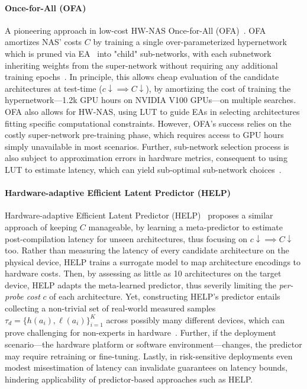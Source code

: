 \paragraph{Once-for-All (OFA)}
A pioneering approach in low-cost HW-NAS Once-for-All (OFA)~\citep{cai2019once}. OFA amortizes NAS' costs \( C \) by training a single over-parameterized hypernetwork which is pruned via EA~\citep{real2017large} into "child" sub-networks, with each subnetwork inheriting weights from the super-network without requiring any additional training epochs~\citep{brock2017smash}.
In principle, this allows cheap evaluation of the candidate architectures at test-time (\( c \downarrow \implies C \downarrow \)), by amortizing the cost of training the hypernetwork---1.2k GPU hours on NVIDIA V100 GPUs---on multiple searches. OFA also allows for HW-NAS, using LUT to guide EAs in selecting architectures fitting specific computational constraints. 
However, OFA's success relies on the costly super-network pre-training phase, which requires access to GPU hours simply unavailable in most scenarios. Further, sub-network selection process is also subject to approximation errors in hardware metrics, consequent to using LUT to estimate latency, which can yield sub-optimal sub-network choices~\citep{laube2022expect}.

\paragraph{Hardware-adaptive Efficient Latent Predictor (HELP)}
Hardware-adaptive Efficient Latent Predictor (HELP)~\citep{lee2021hardware} proposes a similar approach of keeping \( C \) manageable, by learning a meta-predictor to estimate post-compilation latency for unseen architectures, thus focusing on \( c \downarrow \implies C \downarrow \) too. Rather than measuring the latency of every candidate architecture on the physical device, HELP trains a surrogate model to map architecture encodings to hardware costs. Then, by assessing as little as 10 architectures on the target device, HELP adapts the meta-learned predictor, thus severily limiting the \emph{per-probe cost} \(c\) of each architecture. 
Yet, constructing HELP's predictor entails collecting a non-trivial set of real-world measured samples \(\tau_d=\{h(a_i), \ell(a_i)\}_{i=1}^K\) across possibly many different devices, which can prove challenging for non-experts in hardware~\citep{li2021hw}. Further, if the deployment scenario---the hardware platform or software environment---changes, the predictor may require retraining or fine-tuning. Lastly, in risk-sensitive deployments even modest misestimation of latency can invalidate guarantees on latency bounds, hindering applicability of predictor-based approaches such as HELP. 

